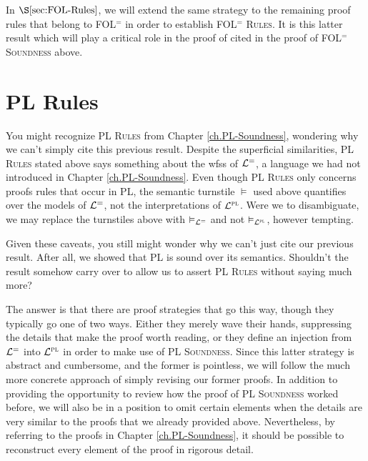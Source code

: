 In $\S\ref{sec:FOL-Rules}$, we will extend the same strategy to the remaining proof rules that belong to FOL$^=$ in order to establish \textsc{FOL$^=$ Rules}.
It is this latter result which will play a critical role in the proof of  cited in the proof of \textsc{FOL$^=$ Soundness} above.





\section{PL Rules}%
  \label{sec:PL-Rules}

You might recognize \textsc{PL Rules} from Chapter \ref{ch.PL-Soundness}, wondering why we can't simply cite this previous result.
Despite the superficial similarities, \textsc{PL Rules} stated above says something about the wfss of $\mathcal{L}^{=}$, a language we had not introduced in Chapter \ref{ch.PL-Soundness}.
Even though \textsc{PL Rules} only concerns proofs rules that occur in PL, the semantic turnstile $\vDash$ used above quantifies over the models of $\mathcal{L}^{=}$, not the interpretations of $\mathcal{L}^{\textsc{pl}}$. 
Were we to disambiguate, we may replace the turnstiles above with $\vDash_{\mathcal{L}^{=}}$ and not $\vDash_{\mathcal{L}^{\textsc{pl}}}$, however tempting. 

Given these caveats, you still might wonder why we can't just cite our previous result. 
After all, we showed that PL is sound over its semantics.
Shouldn't the result somehow carry over to allow us to assert \textsc{PL Rules} without saying much more?

The answer is that there are proof strategies that go this way, though they typically go one of two ways.
Either they merely wave their hands, suppressing the details that make the proof worth reading, or they define an injection from $\mathcal{L}^{=}$ into $\mathcal{L}^{\textsc{pl}}$ in order to make use of \textsc{PL Soundness}. %
Since this latter strategy is abstract and cumbersome, and the former is pointless, we will follow the much more concrete approach of simply revising our former proofs.
In addition to providing the opportunity to review how the proof of \textsc{PL Soundness} worked before, we will also be in a position to omit certain elements when the details are very similar to the proofs that we already provided above.
Nevertheless, by referring to the proofs in Chapter \ref{ch.PL-Soundness}, it should be possible to reconstruct every element of the proof in rigorous detail.





